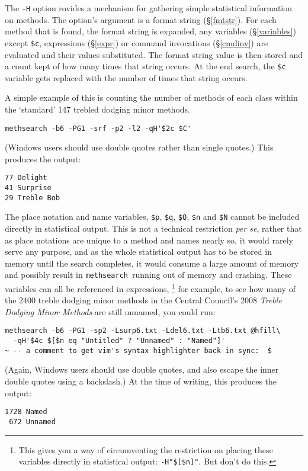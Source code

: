 \documentclass[a4paper,11pt,oneside]{book}
\makeatletter
\newcommand{\oidx}[2]{\index{#1@{\hspace*{-\optwidth}\texttt{-}#2}|ulink}}
\newcommand{\oid}[2]{\oidx{#1}{\texttt{#1}}%
  \index{#2@{\hspace*{-\loptwidth}\texttt{--#2}}|see{\texttt{-#1}}}}
\newcommand{\fspec}[1]{\index{#1@{\hspace*{-\fspecwidth}\texttt{\$#1}}}}
\def\methsearch{\texttt{meth\-search}}
\newcommand{\sref}[1]{\hyperref[#1]{\S\ref{#1}}}
\makeatother
\begin{document}
The \verb+-H+ option\oid{H} provides a mechanism for gathering simple
statistical information on methods.  The option's argument is a format string 
(\sref{fmtstr}).  For each method that is found, the format string is expanded,
any variables (\sref{variables}) except \verb+$c+\fspec{c}, 
expressions (\sref{expr}) or command invocations (\sref{cmdinv}) are evaluated 
and their values substituted.  The format string value is then stored
and a count kept of how many times that string occurs.  At the end search,
the \verb+$c+ variable gets replaced with the number of times that string 
occurs.

A simple example of this is counting the number of methods of each class
within the `standard' 147 trebled dodging minor methods.%

\begin{Verbatim}
methsearch -b6 -PG1 -srf -p2 -l2 -qH'$2c $C'
\end{Verbatim}

(Windows users should use double quotes rather than single quotes.)
This produces the output:

\begin{Verbatim}
77 Delight
41 Surprise
29 Treble Bob
\end{Verbatim}

The place notation and name variables, \verb+$p+, \verb+$q+,
\verb+$Q+, \verb+$n+ and \verb+$N+ cannot be included directly in 
statistical output.  
This is not a technical restriction \textit{per se}, rather that as 
place notations are unique to a method and names nearly so, it would rarely
serve any purpose, and as the whole statistical output has to be stored
in memory until the search completes, it would consume a large amount of
memory and possibly result in \methsearch\ running out of memory and crashing.
These variables can all be referenced in expressions,%
\footnote{This gives you a way of circumventing the restriction on placing
these variables directly in statistical output: \verb+-H"$[$n]"+.  But 
don't do this.}
for example, to see
how many of the 2400 treble dodging minor methods in the Central Council's
2008 \textit{Treble Dodging Minor Methods}
are still unnamed, you could run:

\begin{Verbatim}[commandchars=@<>,commentchar=~]
methsearch -b6 -PG1 -sp2 -Lsurp6.txt -Ldel6.txt -Ltb6.txt @hfill\
  -qH'$4c $[$n eq "Untitled" ? "Unnamed" : "Named"]' 
~ -- a comment to get vim's syntax highlighter back in sync:  $
\end{Verbatim}
(Again, Windows users should use double quotes, and also escape the inner
double quotes using a backslash.\index{shell!escaping})
At the time of writing, this produces the output:
\begin{Verbatim}
1728 Named
 672 Unnamed
\end{Verbatim}
\end{document}
